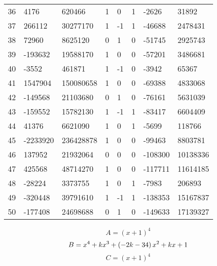 \documentclass{amsart}
\begin{document}
\begin{longtable}{|l|l|l|lllll|}
36&4176&620466&1&0&1&-2626&31892\\
37&266112&30277170&1&-1&1&-46688&2478431\\
38&72960&8625120&0&1&0&-51745&2925743\\
39&-193632&19588170&1&0&0&-57201&3486681\\
40&-3552&461871&1&-1&0&-3942&65367\\
41&1547904&150080658&1&0&0&-69388&4833068\\
42&-149568&21103680&0&1&0&-76161&5631039\\
43&-159552&15782130&1&-1&1&-83417&6604409\\
44&41376&6621090&1&0&1&-5699&118766\\
45&-2233920&236428878&1&0&0&-99463&8803781\\
46&137952&21932064&0&0&0&-108300&10138336\\
47&425568&48714270&1&0&0&-117711&11614185\\
48&-28224&3373755&1&0&1&-7983&206893\\
49&-320448&39791610&1&-1&1&-138353&15167837\\
50&-177408&24698688&0&1&0&-149633&17139327\\
\hline
\end{longtable}
$$A=(x
 + 1)^{4}$$
$$B=x^4
 + k\*x^3
 + \left(-2\*k
 - 34\right) \*x^2
 + k\*x
 + 1$$
$$C=(x
 + 1)^{4}$$
\end{document}
